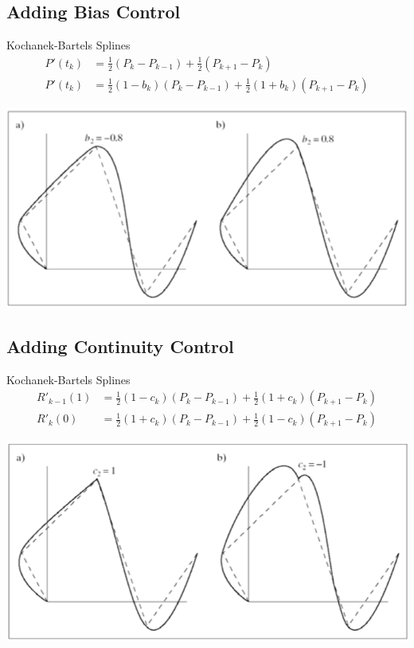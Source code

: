 \documentclass{article}
\begin{document}
\subsection*{Adding Bias Control}
Kochanek-Bartels Splines
\begin{align*}
    P'(t_k) &= \frac{1}{2}(P_k - P_{k - 1}) + \frac{1}{2}(P_{k + 1} - P_k)\\
    P'(t_k) &= \frac{1}{2}(1 - b_k)(P_k - P_{k - 1}) + \frac{1}{2}(1 + b_k)(P_{k + 1} - P_k)
\end{align*}
\begin{center}
    \includegraphics*[scale=0.7]{W3_13.png}
\end{center}

\subsection*{Adding Continuity Control}
Kochanek-Bartels Splines
\begin{align*}
    R'_{k - 1}(1) &= \frac{1}{2}(1 - c_k)(P_k - P_{k - 1}) + \frac{1}{2}(1 + c_k)(P_{k + 1} - P_k)\\
    R'_k(0) &= \frac{1}{2}(1 + c_k)(P_k - P_{k - 1}) + \frac{1}{2}(1 - c_k)(P_{k + 1} - P_k)
\end{align*}
\begin{center}
    \includegraphics*[scale=0.7]{W3_14.png}
\end{center}
\end{document}
